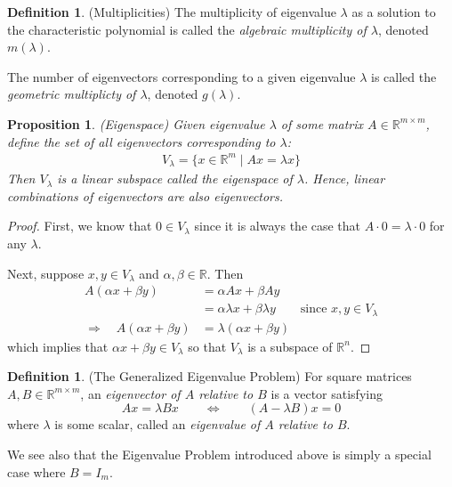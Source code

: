 \documentclass[12pt]{article}
\numberwithin{equation}{section} %
\theoremstyle{plain}
\newtheorem{prop}[thm]{Proposition}
\theoremstyle{definition}
\newtheorem{defn}[thm]{Definition}
\theoremstyle{remark}
\newcommand{\R}{\mathbb{R}}
\newcommand{\Rn}{\mathbb{R}^n}
\newcommand{\Rm}{\mathbb{R}^m}
\newcommand{\Rmm}{\mathbb{R}^{m\times m}}
\begin{document}
\begin{defn}{(Multiplicities)}
The multiplicity of eigenvalue $\lambda$ as a solution to the
characteristic polynomial is called the \emph{algebraic multiplicity of
$\lambda$}, denoted $m(\lambda)$.

The number of eigenvectors corresponding to a given eigenvalue $\lambda$
is called the \emph{geometric multiplicty of $\lambda$}, denoted
$g(\lambda)$.
\end{defn}

\begin{prop}{\emph{(Eigenspace)}}
Given eigenvalue $\lambda$ of some matrix $A\in\Rmm$, define the set of
all eigenvectors corresponding to $\lambda$:
\begin{align*}
  V_\lambda = \{ x\in \Rm \; | \; Ax = \lambda x \}
\end{align*}
Then $V_\lambda$ is a linear subspace called the
\emph{eigenspace of $\lambda$}. Hence, linear combinations of
eigenvectors are also eigenvectors.
\end{prop}
\begin{proof}
First, we know that $0\in V_\lambda$ since it is always the case that
$A\cdot 0=\lambda \cdot 0$ for any $\lambda$.

Next, suppose $x,y \in V_\lambda$ and $\alpha,\beta\in\R$. Then
\begin{align*}
  A(\alpha x + \beta y)
  &= \alpha Ax + \beta Ay \\
  &= \alpha \lambda x + \beta \lambda y
  \qquad \text{since $x,y\in V_\lambda$} \\
  \Rightarrow\quad
  A(\alpha x + \beta y)
  &= \lambda (\alpha x + \beta y)
\end{align*}
which implies that $\alpha x + \beta y \in V_\lambda$ so that
$V_\lambda$ is a subspace of $\Rn$.
\end{proof}



\begin{defn}{(The Generalized Eigenvalue Problem)}
For square matrices $A,B\in\Rmm$, an \emph{eigenvector of $A$ relative
to $B$} is a vector satisfying
\begin{equation}
  Ax = \lambda B x
  \qquad \Leftrightarrow \qquad
  (A - \lambda B) x = 0
\end{equation}
where $\lambda$ is some scalar, called an
\emph{eigenvalue of $A$ relative to $B$}.

We see also that the Eigenvalue Problem introduced above is simply a
special case where $B=I_m$.
\end{defn}
\end{document}
